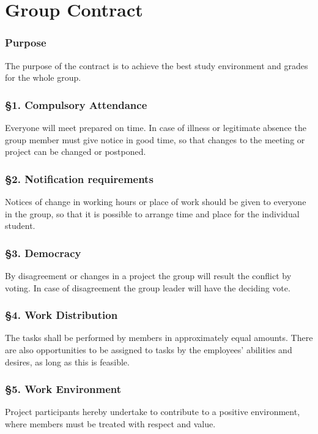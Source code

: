 \chapter{Group Contract}
\label{app:groupcontract}


\vspace*{1.0 cm}
\subsection*{Purpose}
The purpose of the contract is to achieve the best study environment and grades for the whole group.

\subsection*{§1. Compulsory Attendance}
Everyone will meet prepared on time. In case of illness or legitimate absence the group member must give notice in good time, so that changes to the meeting or project can be changed or postponed.

\subsection*{§2. Notification requirements}
Notices of change in working hours or place of work should be given to everyone in the group, so that it is possible to arrange time and place for the individual student.

\subsection*{§3. Democracy}
By disagreement or changes in a project the group will result the conflict by voting. In case of disagreement the group leader will have the deciding vote.

\subsection*{§4. Work Distribution}
The tasks shall be performed by members in approximately equal amounts. There are also opportunities to be assigned to tasks by the employees' abilities and desires, as long as this is feasible.

\subsection*{§5. Work Environment}
Project participants hereby undertake to contribute to a positive environment, where members must be treated with respect and value.

